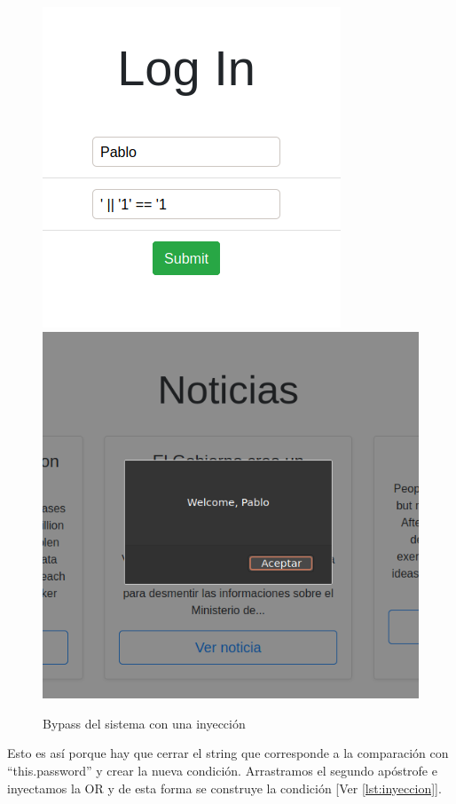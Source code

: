 \documentclass[a4paper,oneside]{article}
\begin{document}
\begin{enumerate}[label=\textbf{\alph*)}]
\begin{figure}[h!]
  \centering
  \includegraphics[scale=0.5]{images/inyeccion.png}\\
  \vspace{1cm}
  \includegraphics[scale=0.5]{images/welcome.png}
  \caption{Bypass del sistema con una inyección}
  \label{fig:login_error2}
\end{figure}

Esto es así porque hay que cerrar el string que corresponde a la comparación con ``this.password'' y crear la nueva condición. Arrastramos el segundo apóstrofe e inyectamos la OR y de esta forma se construye la condición [Ver \ref{lst:inyeccion}].


\end{enumerate}
\end{document}
